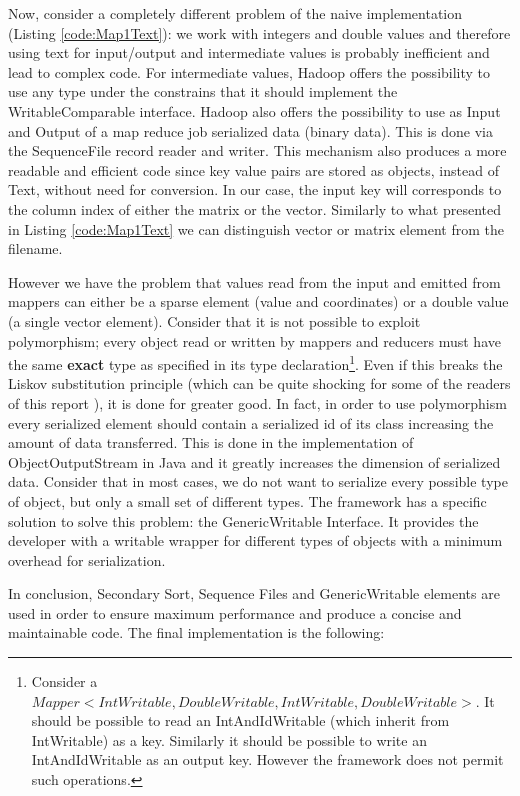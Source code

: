 \documentclass[a4paper,12pt]{article}
\begin{document}
Now, consider a completely different problem of the naive implementation (Listing \ref{code:Map1Text}): we work with integers and double values and therefore using text for input/output and intermediate values is probably inefficient and lead to complex code.
For intermediate values, Hadoop offers the possibility to use any type under the constrains that it should implement the WritableComparable interface.
Hadoop also offers the possibility to use as Input and Output of a map reduce job serialized data (binary data). 
This is done via the SequenceFile record reader and writer.
This mechanism also produces a more readable and efficient code since key value pairs are stored as objects, instead of Text, without need for conversion. 
In our case, the input key will corresponds to the column index of either the matrix or the vector.
Similarly to what presented in Listing \ref{code:Map1Text} we can distinguish vector or matrix element from the filename.

However we have the problem that values read from the input and emitted from mappers can either be a sparse element (value and coordinates) or a double value (a single vector element).
Consider that it is not possible to exploit polymorphism; every object read or written by mappers and reducers must have the same \textbf{exact} type as specified in its type declaration\footnote{Consider a $Mapper<IntWritable,DoubleWritable,IntWritable,DoubleWritable>$. It should be possible to read an IntAndIdWritable (which inherit from IntWritable) as a key. Similarly it should be possible to write an IntAndIdWritable as an output key. However the framework does not permit such operations.}.
Even if this breaks the Liskov substitution principle (which can be quite shocking for some of the readers of this report ), it is done for greater good.
In fact, in order to use polymorphism every serialized element should contain a serialized id of its class increasing the amount of data transferred.
This is done in the implementation of ObjectOutputStream in Java and it greatly increases the dimension of serialized data.
Consider that in most cases, we do not want to serialize every possible type of object, but only a small set of different types.
The framework has a specific solution to solve this problem: the GenericWritable Interface. 
It provides the developer with a writable wrapper for different types of objects with a minimum overhead for serialization.

In conclusion, Secondary Sort, Sequence Files and GenericWritable elements are used in order to ensure maximum performance and produce a concise and maintainable code.
The final implementation is the following:
\end{document}
